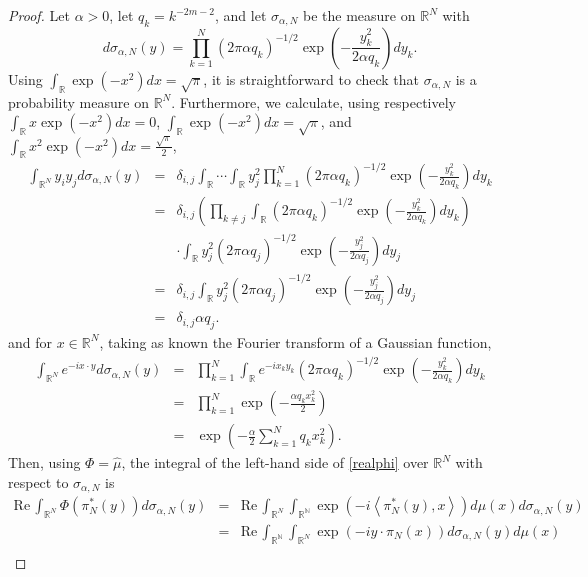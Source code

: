 \documentclass{article}
\newcommand{\inner}[2]{\left\langle #1, #2 \right\rangle}
\def\Re{\ensuremath{\mathrm{Re}}\,}
\theoremstyle{definition}
\begin{document}
\begin{proof}
Let $\alpha>0$, 
let $q_k=k^{-2m-2}$, and let $\sigma_{\alpha,N}$ be the measure on $\mathbb{R}^N$ with 
\[
d\sigma_{\alpha,N}(y) = \prod_{k=1}^N (2\pi \alpha q_k)^{-1/2} \exp\left(-\frac{y_k^2}{2\alpha q_k}\right) dy_k.
\]
Using $\int_{\mathbb{R}} \exp(-x^2) dx=\sqrt{\pi}$, it is straightforward to check that
$\sigma_{\alpha,N}$ is a probability measure on $\mathbb{R}^N$. Furthermore, we calculate, using respectively
$\int_{\mathbb{R}} x \exp(-x^2) dx=0$,
$\int_{\mathbb{R}} \exp(-x^2) dx=\sqrt{\pi}$, and $\int_{\mathbb{R}} x^2 \exp(-x^2) dx=\frac{\sqrt{\pi}}{2}$,
\begin{eqnarray*}
\int_{\mathbb{R}^N} y_i y_j d\sigma_{\alpha,N}(y)&=&\delta_{i,j} \int_{\mathbb{R}} \cdots \int_{\mathbb{R}} y_j^2 \prod_{k=1}^N (2\pi \alpha q_k)^{-1/2} \exp\left(-\frac{y_k^2}{2\alpha q_k}\right) dy_k\\
&=&\delta_{i,j} \left( \prod_{k \neq j} \int_{\mathbb{R}} (2\pi \alpha q_k)^{-1/2} \exp\left(-\frac{y_k^2}{2\alpha q_k}\right) dy_k \right)\\
&&\cdot \int_{\mathbb{R}} y_j^2 (2\pi \alpha q_j)^{-1/2} \exp\left(-\frac{y_j^2}{2\alpha q_j}\right) dy_j\\
&=&\delta_{i,j}\int_{\mathbb{R}} y_j^2 (2\pi \alpha q_j)^{-1/2} \exp\left(-\frac{y_j^2}{2\alpha q_j}\right) dy_j\\
&=&\delta_{i,j} \alpha q_j.
\end{eqnarray*}
and for $x \in \mathbb{R}^N$,  taking as known the Fourier transform of a Gaussian function,
\begin{eqnarray*}
\int_{\mathbb{R}^N} e^{-ix\cdot y} d\sigma_{\alpha,N}(y)&=&\prod_{k=1}^N \int_{\mathbb{R}} e^{-ix_ky_k} (2\pi \alpha q_k)^{-1/2} \exp\left(-\frac{y_k^2}{2\alpha q_k}\right) dy_k\\
&=&\prod_{k=1}^N \exp\left(-\frac{\alpha q_k x_k^2}{2}\right)\\
&=&\exp\left(-\frac{\alpha}{2} \sum_{k=1}^N q_k x_k^2 \right).
\end{eqnarray*}
Then, using $\Phi=\hat{\mu}$, the integral of the left-hand side of \eqref{realphi} over $\mathbb{R}^N$ with respect to $\sigma_{\alpha,N}$ is
\begin{eqnarray*}
\Re \int_{\mathbb{R}^N} \Phi(\pi_N^*(y)) d\sigma_{\alpha,N}(y)&=&\Re \int_{\mathbb{R}^N} \int_{\mathbb{R}^\mathbb{N}} \exp(-i\inner{\pi_N^*(y)}{x}) d\mu(x) d\sigma_{\alpha,N}(y)\\
&=&\Re \int_{\mathbb{R}^\mathbb{N}} \int_{\mathbb{R}^N} \exp(-i  y\cdot \pi_N(x)) d\sigma_{\alpha,N}(y) d\mu(x)\\

\end{eqnarray*}
\end{proof}
\end{document}
